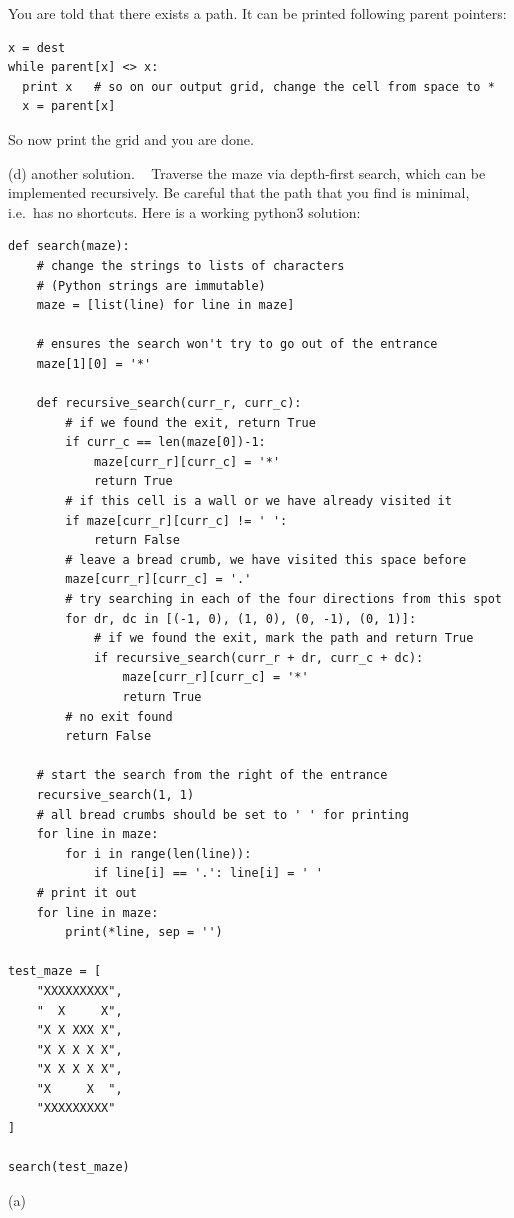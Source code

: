 \documentclass[12pt]{article}
\begin{document}
You are told that there exists a path.
It can be printed following parent pointers:

\begin{verbatim}
x = dest
while parent[x] <> x:
  print x   # so on our output grid, change the cell from space to *
  x = parent[x]
\end{verbatim}

So now print the grid and you are done.

(d) another solution. ~
Traverse the maze via depth-first search,
which can be implemented recursively. Be careful that the path
that you find is minimal, i.e.\ has no shortcuts.
Here is a working python3 solution:

{\footnotesize\begin{verbatim}
def search(maze):
    # change the strings to lists of characters
    # (Python strings are immutable)
    maze = [list(line) for line in maze]

    # ensures the search won't try to go out of the entrance
    maze[1][0] = '*'

    def recursive_search(curr_r, curr_c):
        # if we found the exit, return True
        if curr_c == len(maze[0])-1:
            maze[curr_r][curr_c] = '*'
            return True
        # if this cell is a wall or we have already visited it
        if maze[curr_r][curr_c] != ' ':
            return False
        # leave a bread crumb, we have visited this space before
        maze[curr_r][curr_c] = '.'
        # try searching in each of the four directions from this spot
        for dr, dc in [(-1, 0), (1, 0), (0, -1), (0, 1)]:
            # if we found the exit, mark the path and return True
            if recursive_search(curr_r + dr, curr_c + dc):
                maze[curr_r][curr_c] = '*'
                return True
        # no exit found
        return False

    # start the search from the right of the entrance
    recursive_search(1, 1)
    # all bread crumbs should be set to ' ' for printing
    for line in maze:
        for i in range(len(line)):
            if line[i] == '.': line[i] = ' '
    # print it out
    for line in maze:
        print(*line, sep = '')

test_maze = [
    "XXXXXXXXX",
    "  X     X",
    "X X XXX X",
    "X X X X X",
    "X X X X X",
    "X     X  ",
    "XXXXXXXXX"
]

search(test_maze)
\end{verbatim}}
(a)
\vfill
\end{document}
